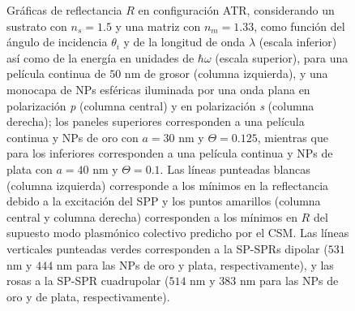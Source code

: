 \begin{figure}[h!]
\vspace*{-.7em}
\caption{Gráficas de reflectancia $R$ en configuración ATR, considerando un sustrato con $n_s=1.5$ y una matriz con $n_m=1.33$, como función del ángulo de incidencia $\theta_i$ y de la longitud de onda $\lambda$ (escala inferior) así como de la energía en unidades de $\hbar\omega$ (escala superior), para una película continua de $50$ nm de grosor (columna izquierda), y una monocapa de NPs esféricas iluminada por una onda plana en polarización \emph{p} (columna central) y en polarización \emph{s} (columna derecha); los paneles superiores corresponden a una película continua y NPs de oro con $a=30$ nm y $\Theta=0.125$, mientras que para los inferiores corresponden a una película continua y NPs de plata  con $a=40$ nm y $\Theta=0.1$.  Las líneas punteadas blancas (columna izquierda) corresponde a los mínimos en la reflectancia debido a la excitación del SPP y los puntos amarillos (columna central y columna derecha) corresponden a los mínimos en $R$ del supuesto modo plasmónico colectivo predicho por el CSM. Las líneas verticales punteadas verdes corresponden a la SP-SPRs dipolar ($531$ nm y $444$ nm para las NPs de oro y plata, respectivamente), y las rosas a la SP-SPR cuadrupolar ($514$ nm y $383$ nm para las NPs de oro y de plata, respectivamente).}
\label{fig:SPPCSM}
\end{figure}

